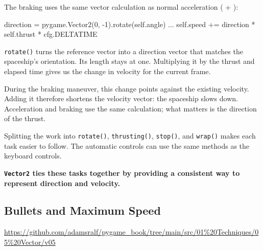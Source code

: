 The braking uses the same vector calculation as normal acceleration ( + ):
\begin{codebox}
	direction = pygame.Vector2(0, -1).rotate(self.angle)
	...
	self.speed += direction * self.thrust * cfg.DELTATIME
\end{codebox}


\begin{hintbox}[Summary]
	\begin{figure}%
		\begin{center}%
			\vspace{-2em}%
		\end{center}%
	\end{figure}%
		\texttt{rotate()} turns the reference vector into a direction vector that matches the spaceship's orientation. Its length stays at one. Multiplying it by the thrust and elapsed time gives us the change in velocity for the current frame.
	
	During the braking maneuver, this change points against the existing velocity. Adding it therefore shortens the velocity vector: the spaceship slows down. Acceleration and braking use the same calculation; what matters is the direction of the thrust.
	
	Splitting the work into \texttt{rotate()}, \texttt{thrusting()}, \texttt{stop()}, and \texttt{wrap()} makes each task easier to follow. The automatic controls can use the same methods as the keyboard controls.
	
	\textbf{\texttt{Vector2} ties these tasks together by providing a consistent way to represent direction and velocity.}
\end{hintbox}

\subsection{Bullets and Maximum Speed}\label{secVectorBullets}

\begin{diskbox}
	\url{https://github.com/adamsralf/pygame_book/tree/main/src/01%20Techniques/05%20Vector/v05}
\end{diskbox}

